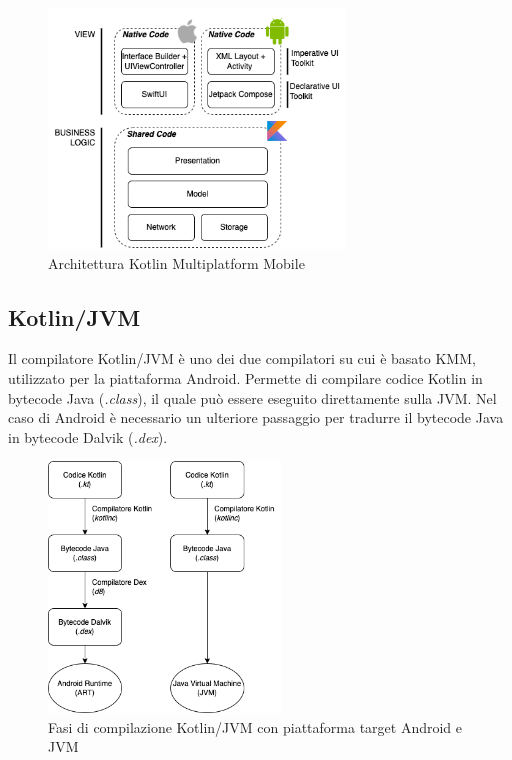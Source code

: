 \begin{figure}[H]
\centering
\includegraphics[width=0.7\textwidth]{img/tesi-8-kmm.drawio.png}
\caption{Architettura Kotlin Multiplatform Mobile}
\end{figure}

\subsection{Kotlin/JVM}
Il compilatore Kotlin/JVM è uno dei due compilatori su cui è basato KMM, utilizzato per la piattaforma Android. Permette di compilare codice Kotlin in bytecode Java (\textit{.class}), il quale può essere eseguito direttamente sulla JVM. Nel caso di Android è necessario un ulteriore passaggio per tradurre il bytecode Java in bytecode Dalvik (\textit{.dex}).

\begin{figure}[H]
\centering
\includegraphics[width=0.55\textwidth]{img/tesi-9-kotlinjvm.drawio.png}
\caption{Fasi di compilazione Kotlin/JVM con piattaforma target Android e JVM}
\end{figure}

